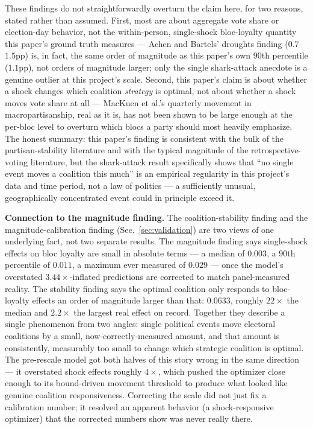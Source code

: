 \documentclass[11pt]{article}
\begin{document}
These findings do not straightforwardly overturn the claim here, for two
reasons, stated rather than assumed. First, most are about aggregate vote
share or election-day behavior, not the within-person, single-shock
bloc-loyalty quantity this paper's ground truth measures --- Achen and
Bartels' droughts finding ($0.7$--$1.5$pp) is, in fact, the same order of
magnitude as this paper's own 90th percentile ($1.1$pp), not orders of
magnitude larger; only the single shark-attack anecdote is a genuine
outlier at this project's scale. Second, this paper's claim is about
whether a shock changes which coalition \emph{strategy} is optimal, not
about whether a shock moves vote share at all --- MacKuen et al.'s quarterly
movement in macropartisanship, real as it is, has not been shown to be
large enough at the per-bloc level to overturn which blocs a party should
most heavily emphasize. The honest summary: this paper's finding is
consistent with the bulk of the partisan-stability literature and with the
typical magnitude of the retrospective-voting literature, but the
shark-attack result specifically shows that ``no single event moves a
coalition this much'' is an empirical regularity in this project's data and
time period, not a law of politics --- a sufficiently unusual, geographically
concentrated event could in principle exceed it.

\textbf{Connection to the magnitude finding.} The coalition-stability
finding and the magnitude-calibration finding (Sec.~\ref{sec:validation})
are two views of one underlying fact, not two separate results. The
magnitude finding says single-shock effects on bloc loyalty are small in
absolute terms --- a median of $0.003$, a 90th percentile of $0.011$, a
maximum ever measured of $0.029$ --- once the model's overstated
$3.44\times$-inflated predictions are corrected to match panel-measured
reality. The stability finding says the optimal coalition only responds to
bloc-loyalty effects an order of magnitude larger than that: $0.0633$,
roughly $22\times$ the median and $2.2\times$ the largest real effect on
record. Together they describe a single phenomenon from two angles: single
political events move electoral coalitions by a small, now-correctly-measured
amount, and that amount is consistently, measurably too small to change
which strategic coalition is optimal. The pre-rescale model got both halves
of this story wrong in the same direction --- it overstated shock effects
roughly $4\times$, which pushed the optimizer close enough to its
bound-driven movement threshold to produce what looked like genuine
coalition responsiveness. Correcting the scale did not just fix a
calibration number; it resolved an apparent behavior (a shock-responsive
optimizer) that the corrected numbers show was never really there.
\end{document}
